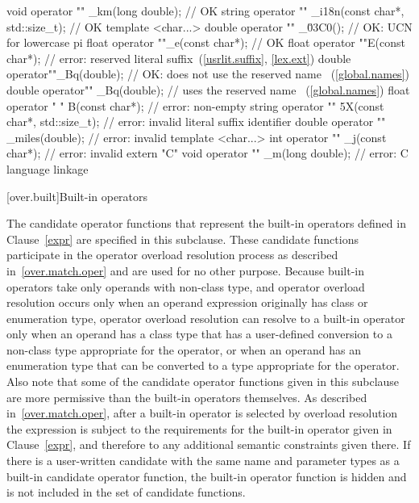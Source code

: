 \pnum
\enterexample
\begin{codeblock}
void operator "" _km(long double);                  // OK
string operator "" _i18n(const char*, std::size_t); // OK
template <char...> double operator "" _\u03C0();    // OK: UCN for lowercase pi
float operator ""_e(const char*);                   // OK
float operator ""E(const char*);                    // error: reserved literal suffix~(\ref{usrlit.suffix}, \ref{lex.ext})
double operator""_Bq(double);                       // OK: does not use the reserved name ~(\ref{global.names})
double operator"" _Bq(double);                      // uses the reserved name ~(\ref{global.names})
float operator " " B(const char*);                  // error: non-empty 
string operator "" 5X(const char*, std::size_t);    // error: invalid literal suffix identifier
double operator "" _miles(double);                  // error: invalid 
template <char...> int operator "" _j(const char*); // error: invalid 
extern "C" void operator "" _m(long double);        // error: C language linkage
\end{codeblock}
\exitexample%

[over.built]{Built-in operators}%

\pnum
The candidate operator functions that represent the built-in operators
defined in Clause~\ref{expr} are specified in this subclause.
These candidate
functions participate in the operator overload resolution process as
described in~\ref{over.match.oper} and are used for no other purpose.
\enternote
Because built-in operators take only operands with non-class type,
and operator overload resolution occurs only when an operand expression
originally has class or enumeration type,
operator overload resolution can resolve to a built-in operator only
when an operand has a class type that has a user-defined conversion to
a non-class type appropriate for the operator, or when an operand has
an enumeration type that can be converted to a type appropriate
for the operator.
Also note that some of the candidate operator functions given in this subclause are
more permissive than the built-in operators themselves.
As
described in~\ref{over.match.oper}, after a built-in operator is selected
by overload resolution the expression is subject to the requirements for
the built-in operator given in Clause~\ref{expr}, and therefore to any
additional semantic constraints given there.
If there is a user-written
candidate with the same name and parameter types as a built-in
candidate operator function, the built-in operator function
is hidden and is not included in the set of candidate functions.
\exitnote

